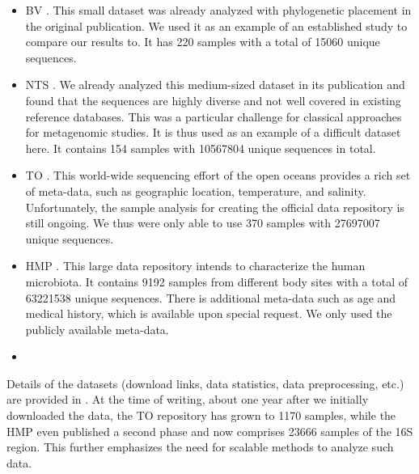 \begin{itemize}
    \item   \acf{BV} \cite{Srinivasan2012}.
            This small dataset was already analyzed with phylogenetic placement in the original publication.
            We used it as an example of an established study to compare our results to.
            It has \num{220} samples with a total of \num{15 060} unique sequences.
    \item   \acf{NTS} \cite{Mahe2017}.
            We already analyzed this medium-sized dataset in its publication and found that
            the sequences are highly diverse and not well covered in existing reference databases.
            This was a particular challenge for classical approaches for metagenomic studies.
            It is thus used as an example of a difficult dataset here.
            It contains \num{154} samples with \num{10 567 804} unique sequences in total.
    \item   \acf{TO} \cite{Karsenti2011,Sunagawa2015,Guidi2016}.
            This world-wide sequencing effort of the open oceans provides a rich set of meta-data,
            such as geographic location, temperature, and salinity.
            Unfortunately, the sample analysis for creating the official data repository is still ongoing.
            We thus were only able to use \num{370} samples with \num{27 697 007} unique sequences.
    \item   \acf{HMP} \cite{Huttenhower2012,Methe2012}.
            This large data repository intends to characterize the human microbiota.
            It contains \num{9192} samples from different body sites with a total of \num{63 221 538} unique sequences.
            There is additional meta-data such as age and medical history, which is available upon special request.
            We only used the publicly available meta-data.
    \item   {}
\end{itemize}

Details of the datasets (download links, data statistics, data preprocessing, etc.)
are provided in . %
At the time of writing, about one year after we initially downloaded the data,
the \ac{TO} repository has grown to \num{1 170} samples,
while the \ac{HMP} even published a second phase and now comprises \num{23 666} samples of the 16S region.
This further emphasizes the need for scalable methods to analyze such data.

